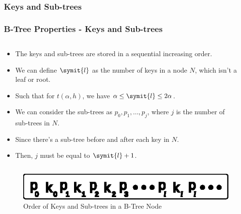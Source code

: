 \documentclass{beamer}
\begin{document}
\begin{frame}
    \subsubsection{Keys and Sub-trees}
    \frametitle{B-Tree Properties - Keys and Sub-trees}
    \begin{columns}
        \begin{column}{\textlecolumn}
            \begin{block}{}
                \vspace{-0.75cm}
                \begin{itemize}
                    \item The keys and sub-trees are stored in a sequential increasing order.
                    \item We can define \(\symit{l}\) as the number of keys in a node \(N\), which isn't a leaf or root.
                    \item Such that for \(t\left(\alpha, h\right)\), we have \(\alpha \leq \symit{l} \leq 2\alpha\).
                    \item We can consider the sub-trees as \(p_0, p_1, \ldots, p_j\), where \(j\) is the number of sub-trees in \(N\).
                    \item Since there's a sub-tree before and after each key in \(N\).
                    \item Then, \(j\) must be equal to \(\symit{l} + 1\).
                \end{itemize}
            \end{block}
        \end{column}
        \begin{column}{\textricolumn}
            \begin{block}{}
            \end{block}
        \end{column}
    \end{columns}
    \begin{figure}[h!]
        \includegraphics[width=\linewidth]{resources/made/key_subtree_order.eps}
        \caption{Order of Keys and Sub-trees in a B-Tree Node}
    \end{figure}
\end{frame}
\end{document}
